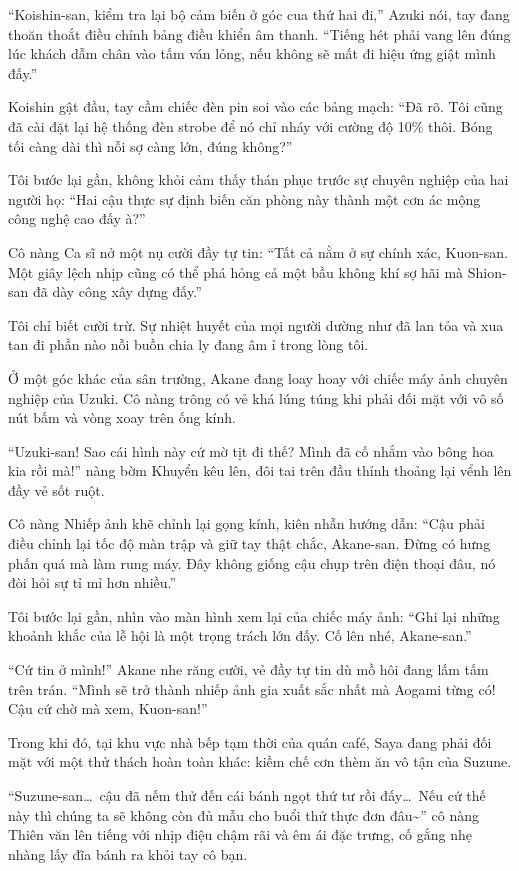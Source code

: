 \documentclass[../main.tex]{subfiles}
\begin{document}
``Koishin-san, kiểm tra lại bộ cảm biến ở góc cua thứ hai đi,'' Azuki nói, tay đang thoăn thoắt điều chỉnh bảng điều khiển âm thanh. ``Tiếng hét phải vang lên đúng lúc khách dẫm chân vào tấm ván lỏng, nếu không sẽ mất đi hiệu ứng giật mình đấy.''

Koishin gật đầu, tay cầm chiếc đèn pin soi vào các bảng mạch: ``Đã rõ. Tôi cũng đã cài đặt lại hệ thống đèn strobe để nó chỉ nháy với cường độ 10\% thôi. Bóng tối càng dài thì nỗi sợ càng lớn, đúng không?''

Tôi bước lại gần, không khỏi cảm thấy thán phục trước sự chuyên nghiệp của hai người họ: ``Hai cậu thực sự định biến căn phòng này thành một cơn ác mộng công nghệ cao đấy à?''

Cô nàng Ca sĩ nở một nụ cười đầy tự tin: ``Tất cả nằm ở sự chính xác, Kuon-san. Một giây lệch nhịp cũng có thể phá hỏng cả một bầu không khí sợ hãi mà Shion-san đã dày công xây dựng đấy.''

Tôi chỉ biết cười trừ. Sự nhiệt huyết của mọi người dường như đã lan tỏa và xua tan đi phần nào nỗi buồn chia ly đang âm ỉ trong lòng tôi.

Ở một góc khác của sân trường, Akane đang loay hoay với chiếc máy ảnh chuyên nghiệp của Uzuki. Cô nàng trông có vẻ khá lúng túng khi phải đối mặt với vô số nút bấm và vòng xoay trên ống kính.

``Uzuki-san! Sao cái hình này cứ mờ tịt đi thế? Mình đã cố nhắm vào bông hoa kia rồi mà!'' nàng bờm Khuyển kêu lên, đôi tai trên đầu thỉnh thoảng lại vểnh lên đầy vẻ sốt ruột.

Cô nàng Nhiếp ảnh khẽ chỉnh lại gọng kính, kiên nhẫn hướng dẫn: ``Cậu phải điều chỉnh lại tốc độ màn trập và giữ tay thật chắc, Akane-san. Đừng có hưng phấn quá mà làm rung máy. Đây không giống cậu chụp trên điện thoại đâu, nó đòi hỏi sự tỉ mỉ hơn nhiều.''

Tôi bước lại gần, nhìn vào màn hình xem lại của chiếc máy ảnh: ``Ghi lại những khoảnh khắc của lễ hội là một trọng trách lớn đấy. Cố lên nhé, Akane-san.''

``Cứ tin ở mình!'' Akane nhe răng cười, vẻ đầy tự tin dù mồ hôi đang lấm tấm trên trán. ``Mình sẽ trở thành nhiếp ảnh gia xuất sắc nhất mà Aogami từng có! Cậu cứ chờ mà xem, Kuon-san!''

Trong khi đó, tại khu vực nhà bếp tạm thời của quán café, Saya đang phải đối mặt với một thử thách hoàn toàn khác: kiềm chế cơn thèm ăn vô tận của Suzune.

``Suzune-san\dots\ cậu đã nếm thử đến cái bánh ngọt thứ tư rồi đấy\dots\ Nếu cứ thế này thì chúng ta sẽ không còn đủ mẫu cho buổi thử thực đơn đâu\~{}'' cô nàng Thiên văn lên tiếng với nhịp điệu chậm rãi và êm ái đặc trưng, cố gắng nhẹ nhàng lấy đĩa bánh ra khỏi tay cô bạn.
\end{document}
